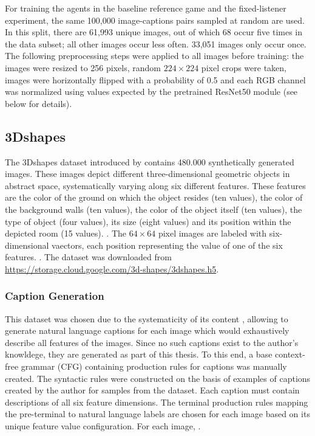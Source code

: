 For training the agents in the baseline reference game and the fixed-listener experiment, the same 100,000 image-captions pairs sampled at random are used. In this split, there are 61,993 unique images, out of which 68 occur five times in the data subset; all other images occur less often. 33,051 images only occur once.
The following preprocessing steps were applied to all images before training: the images were resized to 256 pixels, random $224\times224$ pixel crops were taken, images were horizontally flipped with a probability of 0.5 and each RGB channel was normalized using values expected by the pretrained ResNet50 module (see below for details).



\subsection{3Dshapes}
The 3Dshapes dataset introduced by \textcite{burgess20183d} contains 480.000 synthetically generated images. These images depict different three-dimensional geometric objects in abstract space, systematically varying along six different features. These features are the color of the ground on which the object resides (ten values), the color of the background walls (ten values), the color of the object itself (ten values), the type of object (four values), its size (eight values) and its position within the depicted room (15 values). . 
The $64\times64$ pixel images are labeled with six-dimensional vaectors, each position representing the value of one of the six features. 
.
The dataset was downloaded from \url{https://storage.cloud.google.com/3d-shapes/3dshapes.h5}.

\subsubsection{Caption Generation}
This dataset was chosen due to the systematicity of its content , allowing to generate natural language captions for each image which would exhaustively describe all features of the images. Since no such captions exist to the author's knowldege, they are generated as part of this thesis. To this end, a base context-free grammar (CFG) containing production rules for captions was manually created. The syntactic rules were constructed on the basis of examples of captions created by the author for samples from the dataset. Each caption must contain descriptions of all six feature dimensions. The terminal production rules mapping the pre-terminal to natural language labels are chosen for each image based on its unique feature value configuration. For each image, .

